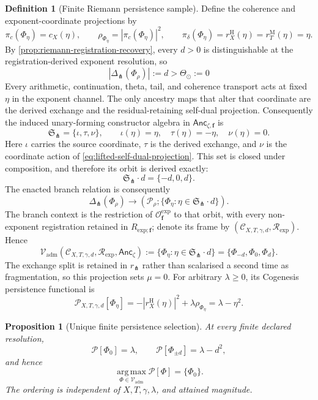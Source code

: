 \documentclass[11pt,a4paper]{article}
\newtheorem{proposition}[theorem]{Proposition}
\theoremstyle{definition}
\newtheorem{definition}[theorem]{Definition}
\newcommand{\Field}{\Phi}
\newcommand{\Cctx}{\mathcal{C}}
\newcommand{\Rres}{\mathcal{R}}
\newcommand{\Persist}{\mathcal{P}}
\newcommand{\DeltaFork}{\Delta_{\pitchfork}}
\newcommand{\Admissible}{\mathcal{V}_{\mathrm{adm}}}
\begin{document}
\begin{definition}[Finite Riemann persistence sample]
Define the coherence and exponent-coordinate projections by
\[
  \pi_c(\Phi_\eta)=c_X(\eta),
  \qquad
  \rho_{\Phi_\eta}=|\pi_c(\Phi_\eta)|^2,
  \qquad
  \pi_\delta(\Phi_\eta)
  =r_X^{\mathrm H}(\eta)
  =r_T^{\mathrm M}(\eta)
  =\eta.
\]
By \cref{prop:riemann-registration-recovery}, every $d>0$ is distinguishable
at the registration-derived exponent resolution, so
\[
  |\DeltaFork(\Field_\rho)|:=d>\Theta_\odot:=0
\]
Every arithmetic, continuation, theta, tail, and coherence transport acts at
fixed $\eta$ in the exponent channel. The only ancestry maps that alter that
coordinate are the derived exchange and the residual-retaining self-dual
projection. Consequently the induced unary-forming constructor algebra in
$\mathsf{Anc}_{\zeta,\mathbf f}$ is
\[
  \mathfrak S_{\pitchfork}
  =
  \{\iota,\tau,\nu\},
  \qquad
  \iota(\eta)=\eta,
  \quad
  \tau(\eta)=-\eta,
  \quad
  \nu(\eta)=0.
\]
Here $\iota$ carries the source coordinate, $\tau$ is the derived exchange,
and $\nu$ is the coordinate action of
\cref{eq:lifted-self-dual-projection}. This set is closed under composition,
and therefore its orbit is derived exactly:
\[
  \mathfrak S_{\pitchfork}\!\cdot d=\{-d,0,d\}.
\]
The enacted branch relation is consequently
\begin{equation}
\label{eq:riemann-branch-enactment}
  \DeltaFork(\Field_\rho)
  \longrightarrow
  \left(
    \mathcal P_\rho;
    \{\Phi_\eta:\eta\in\mathfrak S_{\pitchfork}\!\cdot d\}
  \right).
\end{equation}
The branch context is the restriction of
$\mathcal O_{\mathbf f}^{\mathrm{exp}}$ to that orbit, with every non-exponent
registration retained in $R_{\mathrm{exp};\mathbf f}$; denote its frame by
$(\Cctx_{X,T,\gamma,d},\Rres_{\mathrm{exp}})$. Hence
\[
  \Admissible(\Cctx_{X,T,\gamma,d},\Rres_{\mathrm{exp}},
  \mathsf{Anc}_\zeta)
  :=
  \{\Phi_\eta:\eta\in\mathfrak S_{\pitchfork}\!\cdot d\}
  =
  \{\Phi_{-d},\Phi_0,\Phi_d\}.
\]
The exchange split is retained in $r_{\pitchfork}$ rather than scalarised a
second time as fragmentation, so this projection sets $\mu=0$. For arbitrary
$\lambda\geq0$, its Cogenesis persistence functional is
\begin{equation}
\label{eq:finite-riemann-persistence}
  \Persist_{X,T,\gamma,d}[\Phi_\eta]
  =
  -|r_X^{\mathrm H}(\eta)|^2
  +\lambda\rho_{\Phi_\eta}
  =
  \lambda-\eta^2.
\end{equation}
\end{definition}

\begin{proposition}[Unique finite persistence selection]
\label{prop:unique-riemann-persistence-selection}
At every finite declared resolution,
\[
  \Persist[\Phi_0]=\lambda,
  \qquad
  \Persist[\Phi_{\pm d}]=\lambda-d^2,
\]
and hence
\begin{equation}
\label{eq:unique-riemann-persistence-selection}
  \operatorname*{arg\,max}_{\Phi\in\Admissible}
  \Persist[\Phi]
  =\{\Phi_0\}.
\end{equation}
The ordering is independent of $X,T,\gamma,\lambda$, and attained magnitude.
\end{proposition}
\end{document}

